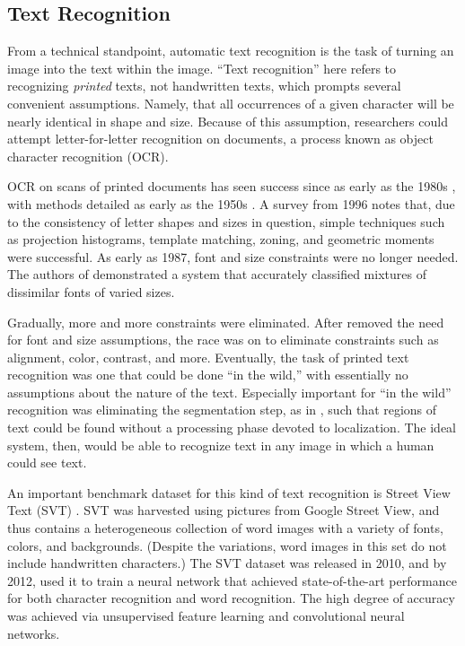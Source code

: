 \documentclass[final]{ukthesis}
\begin{document}
\subsection{Text Recognition}
From a technical standpoint, automatic text recognition is the task of turning an image into the text within the image. ``Text recognition'' here refers to recognizing {\em printed} texts, not handwritten texts, which prompts several convenient assumptions. Namely, that all occurrences of a given character will be nearly identical in shape and size. Because of this assumption, researchers could attempt letter-for-letter recognition on documents, a process known as object character recognition (OCR).

OCR on scans of printed documents has seen success since as early as the 1980s \cite{mantas1986overview,govindan1990character}, with methods detailed as early as the 1950s \cite{glauberman1956character}. A survey from 1996 \cite{trier1996feature} notes that, due to the consistency of letter shapes and sizes in question, simple techniques such as projection histograms, template matching, zoning, and geometric moments were successful. As early as 1987, font and size constraints were no longer needed. The authors of \cite{kahan1987recognition} demonstrated a system that accurately classified mixtures of dissimilar fonts of varied sizes.

Gradually, more and more constraints were eliminated. After \cite{kahan1987recognition} removed the need for font and size assumptions, the race was on to eliminate constraints such as alignment, color, contrast, and more. Eventually, the task of printed text recognition was one that could be done ``in the wild,'' \cite{smith2007overview,wang2012end,jaderberg2016reading} with essentially no assumptions about the nature of the text. Especially important for ``in the wild'' recognition was eliminating the segmentation step, as in \cite{rusinol2015efficient}, such that regions of text could be found without a processing phase devoted to localization. The ideal system, then, would be able to recognize text in any image in which a human could see text.

An important benchmark dataset for this kind of text recognition is Street View Text (SVT) \cite{wang2010word}. SVT was harvested using pictures from Google Street View, and thus contains a heterogeneous collection of word images with a variety of fonts, colors, and backgrounds. (Despite the variations, word images in this set do not include handwritten characters.) The SVT dataset was released in 2010, and by 2012, \cite{wang2012end} used it to train a neural network that achieved state-of-the-art performance for both character recognition and word recognition. The high degree of accuracy was achieved via unsupervised feature learning and convolutional neural networks.
\end{document}
